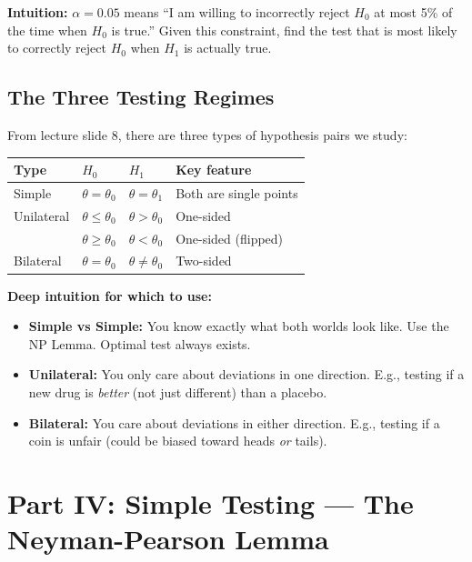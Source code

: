 \documentclass[11pt,a4paper]{article}
\begin{document}
\begin{tcolorbox}[infobox]
\textbf{Intuition:} $\alpha = 0.05$ means ``I am willing to incorrectly reject $H_0$ at most 5\% of the time when $H_0$ is true.'' Given this constraint, find the test that is most likely to correctly reject $H_0$ when $H_1$ is actually true.
\end{tcolorbox}

\subsection{The Three Testing Regimes}

From lecture slide 8, there are three types of hypothesis pairs we study:

\begin{center}
\renewcommand{\arraystretch}{1.6}
\begin{tabular}{@{}llll@{}}
\toprule
\textbf{Type} & \textbf{$H_0$} & \textbf{$H_1$} & \textbf{Key feature}\\
\midrule
Simple & $\theta = \theta_0$ & $\theta = \theta_1$ & Both are single points\\
Unilateral & $\theta \leq \theta_0$ & $\theta > \theta_0$ & One-sided\\
& $\theta \geq \theta_0$ & $\theta < \theta_0$ & One-sided (flipped)\\
Bilateral & $\theta = \theta_0$ & $\theta \neq \theta_0$ & Two-sided\\
\bottomrule
\end{tabular}
\end{center}

\textbf{Deep intuition for which to use:}
\begin{itemize}
  \item \textbf{Simple vs Simple:} You know exactly what both worlds look like. Use the NP Lemma. Optimal test always exists.
  \item \textbf{Unilateral:} You only care about deviations in one direction. E.g., testing if a new drug is \emph{better} (not just different) than a placebo.
  \item \textbf{Bilateral:} You care about deviations in either direction. E.g., testing if a coin is unfair (could be biased toward heads \emph{or} tails).
\end{itemize}

\section{Part IV: Simple Testing --- The Neyman-Pearson Lemma}
\end{document}
